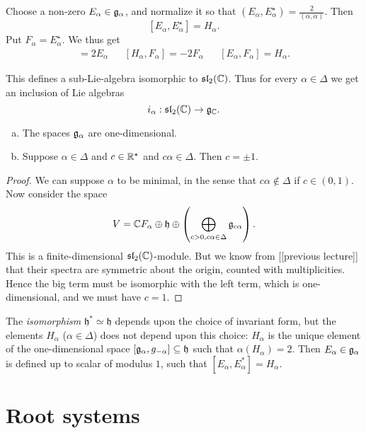 \documentclass[11pt, english]{article}
\begin{document}
Choose a non-zero $E_\alpha \in \mathfrak g_\alpha$, and normalize it so that $(E_\alpha,E_\alpha^\star) = \frac{2}{(\alpha,\alpha)}$. Then
$$
[E_\alpha,E_\alpha^\star] = H_\alpha.
$$
Put $F_\alpha = E_\alpha^\star$. We thus get
\begin{align*}
  [H_\alpha, E_\alpha] = 2 E_\alpha && [H_\alpha ,F_\alpha] = -2F_\alpha && [E_\alpha, F_\alpha] = H_\alpha.
\end{align*}

This defines a sub-Lie-algebra isomorphic to $\mathfrak{sl}_2(\mathbb{C})$. Thus for every $\alpha \in \Delta$ we get an inclusion of Lie algebras
$$
i_\alpha: \mathfrak{sl}_2(\mathbb{C}) \to \mathfrak g_{\mathbb{C}}.
$$

\begin{lemma}
\begin{enumerate}[a)]
\item The spaces $\mathfrak g_\alpha$ are one-dimensional.
\item Suppose $\alpha \in \Delta$ and $c \in \mathbb{R}^\star$ and $c\alpha \in \Delta$. Then $c = \pm 1$.
\end{enumerate}
\end{lemma}
\begin{proof}
We can suppose $\alpha$ to be minimal, in the sense that $c \alpha \not \in \Delta$ if $c \in (0,1)$. Now consider the space
$$
V = \mathbb{C} F_\alpha \oplus \mathfrak h \oplus \left( \bigoplus_{c > 0, c \alpha \in \Delta} \mathfrak g_{c \alpha} \right).
$$
This is a finite-dimensional $\mathfrak{sl}_2(\mathbb{C})$-module. But we know from [[previous lecture]] that their spectra are symmetric about the origin, counted with multiplicities. Hence the big term must be isomorphic with the left term, which is one-dimensional, and we must have $c=1$.
\end{proof}

\begin{remark}
  The \emph{isomorphism} $\mathfrak h ^\ast \simeq \mathfrak h$ depends upon the choice of invariant form, but the elements $H_\alpha$ ($\alpha \in \Delta$) does not depend upon this choice: $H_\alpha$ is the unique element of the one-dimensional space $[\mathfrak g_\alpha, g_{-\alpha}] \subseteq \mathfrak h$ such that $\alpha(H_\alpha)=2$. Then $E_\alpha \in \mathfrak g_\alpha$ is defined up to scalar of modulus $1$, such that $[E_\alpha, E_\alpha^\ast] = H_\alpha$. 
\end{remark}

\newpage
\section{Root systems}
\end{document}
